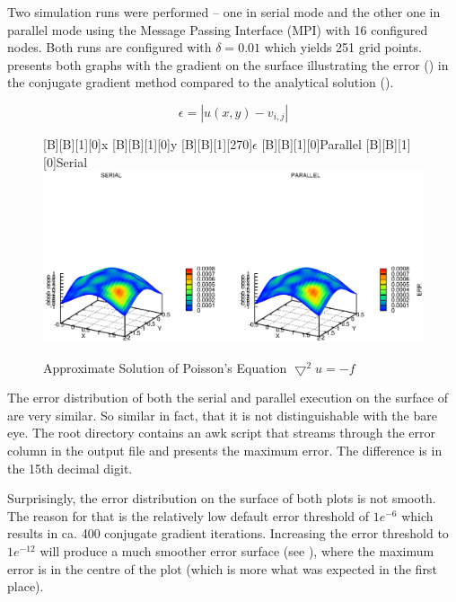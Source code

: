 \documentclass[12pt,a4paper]{report}
\begin{document}
Two simulation runs were performed -- one in serial mode and the other
one in parallel mode using the Message Passing Interface (MPI) with 16
configured nodes. Both runs are configured with $\delta=0.01$ which
yields 251 grid points.  presents both
graphs with the gradient on the surface illustrating the error
() in the conjugate gradient method compared to
the analytical solution ().

\begin{equation}
  \label{eq:error}
  \epsilon=|u(x,y)-v_{i,j}|
\end{equation}

\begin{figure}[htb]
  [B][B][1][0]{x}
  [B][B][1][0]{y}
  [B][B][1][270]{$\epsilon$}
  [B][B][1][0]{Parallel}
  [B][B][1][0]{Serial}
  \includegraphics{./images/poiss.eps}
  \caption{Approximate Solution of Poisson's Equation
    $\bigtriangledown^{2}u=-f$}
  \label{fig:approxPoiss}
\end{figure}

The error distribution of both the serial and parallel execution on
the surface of  are very similar. So
similar in fact, that it is not distinguishable with the bare eye. The
root directory contains an awk script that streams through the error
column in the output file and presents the maximum error. The
difference is in the 15th decimal digit.

Surprisingly, the error distribution on the surface of both plots is
not smooth. The reason for that is the relatively low default error
threshold of $1e^{-6}$ which results in ca. 400 conjugate gradient
iterations. Increasing the error threshold to $1e^{-12}$ will produce
a much smoother error surface (see ),
where the maximum error is in the centre of the plot (which is more
what was expected in the first place).
\end{document}
